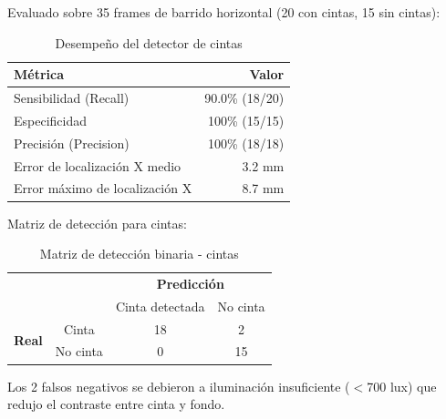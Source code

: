 Evaluado sobre 35 frames de barrido horizontal (20 con cintas, 15 sin cintas):

\begin{table}[H]
\centering
\begin{tabular}{|l|r|}
\hline
\textbf{Métrica} & \textbf{Valor} \\ \hline
Sensibilidad (Recall) & 90.0\% (18/20) \\ \hline
Especificidad & 100\% (15/15) \\ \hline
Precisión (Precision) & 100\% (18/18) \\ \hline
Error de localización X medio & 3.2 mm \\ \hline
Error máximo de localización X & 8.7 mm \\ \hline
\end{tabular}
\caption{Desempeño del detector de cintas}
\label{tab:metricas_cintas}
\end{table}

Matriz de detección para cintas:

\begin{table}[H]
\centering
\begin{tabular}{cc|c|c|}
\cline{3-4}
& & \multicolumn{2}{c|}{\textbf{Predicción}} \\ \cline{3-4}
& & Cinta detectada & No cinta \\ \hline
\multicolumn{1}{|c|}{\multirow{2}{*}{\textbf{Real}}} & Cinta & 18 & 2 \\ \cline{2-4}
\multicolumn{1}{|c|}{} & No cinta & 0 & 15 \\ \hline
\end{tabular}
\caption{Matriz de detección binaria - cintas}
\label{tab:confusion_cintas}
\end{table}

\noindent
Los 2 falsos negativos se debieron a iluminación insuficiente ($<$700 lux) que redujo el contraste entre cinta y fondo.
